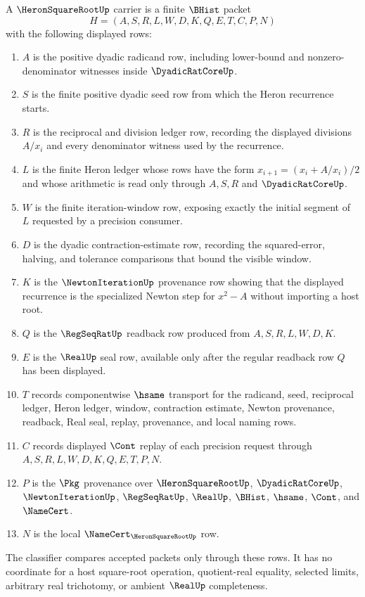 \begin{definition}
\label{def:heron-square-root-carrier}
A $\HeronSquareRootUp$ carrier is a finite $\BHist$ packet
$$
H=(A,S,R,L,W,D,K,Q,E,T,C,P,N)
$$
with the following displayed rows:
\begin{enumerate}
\item $A$ is the positive dyadic radicand row, including lower-bound and nonzero-denominator witnesses inside $\DyadicRatCoreUp$.
\item $S$ is the finite positive dyadic seed row from which the Heron recurrence starts.
\item $R$ is the reciprocal and division ledger row, recording the displayed divisions $A/x_i$ and every denominator witness used by the recurrence.
\item $L$ is the finite Heron ledger whose rows have the form $x_{i+1}=(x_i+A/x_i)/2$ and whose arithmetic is read only through $A,S,R$ and $\DyadicRatCoreUp$.
\item $W$ is the finite iteration-window row, exposing exactly the initial segment of $L$ requested by a precision consumer.
\item $D$ is the dyadic contraction-estimate row, recording the squared-error, halving, and tolerance comparisons that bound the visible window.
\item $K$ is the $\NewtonIterationUp$ provenance row showing that the displayed recurrence is the specialized Newton step for $x^2-A$ without importing a host root.
\item $Q$ is the $\RegSeqRatUp$ readback row produced from $A,S,R,L,W,D,K$.
\item $E$ is the $\RealUp$ seal row, available only after the regular readback row $Q$ has been displayed.
\item $T$ records componentwise $\hsame$ transport for the radicand, seed, reciprocal ledger, Heron ledger, window, contraction estimate, Newton provenance, readback, Real seal, replay, provenance, and local naming rows.
\item $C$ records displayed $\Cont$ replay of each precision request through $A,S,R,L,W,D,K,Q,E,T,P,N$.
\item $P$ is the $\Pkg$ provenance over $\HeronSquareRootUp$, $\DyadicRatCoreUp$, $\NewtonIterationUp$, $\RegSeqRatUp$, $\RealUp$, $\BHist$, $\hsame$, $\Cont$, and $\NameCert$.
\item $N$ is the local $\NameCert_{\HeronSquareRootUp}$ row.
\end{enumerate}
The classifier compares accepted packets only through these rows. It has no coordinate for a host square-root operation, quotient-real equality, selected limits, arbitrary real trichotomy, or ambient $\RealUp$ completeness.
\end{definition}

